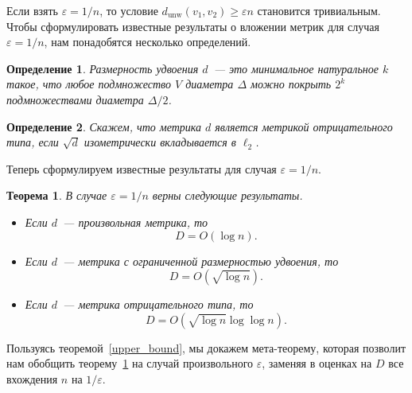 \documentclass[12pt]{article}
\newcommand{\eps}{\varepsilon}
\newcommand{\dunw}{d_{\mathrm{unw}}}
\newtheorem{definition}{Определение}
\newtheorem{theorem}{Теорема}
\begin{document}
    Если взять $\eps = 1/n$, то условие $\dunw(v_1, v_2) \geq \eps n$ становится тривиальным.
    Чтобы сформулировать известные результаты о вложении метрик для случая $\eps = 1/n$, нам понадобятся несколько
    определений.

    \begin{definition}
        \emph{Размерность удвоения} $d$~--- это минимальное натуральное $k$ такое, что любое подмножество $V$
        диаметра $\Delta$ можно покрыть $2^k$ подмножествами диаметра $\Delta / 2$.
    \end{definition}
    \begin{definition}
        Скажем, что метрика $d$ является \emph{метрикой отрицательного типа}, если $\sqrt{d}$ изометрически
        вкладывается в $\ell_2$.
    \end{definition}

    Теперь сформулируем известные результаты для случая $\eps = 1/n$.

    \begin{theorem}
        \label{embeddings}
        В случае $\eps = 1 / n$ верны следующие результаты.
        \begin{itemize}
            \item
            \cite{B85} Если $d$~--- произвольная метрика, то
            $$
                D = O(\log n).
            $$
            \item
            \cite{GKL03} Если $d$~--- метрика с ограниченной размерностью удвоения, то
            $$
                D = O\left(\sqrt{\log n}\right).
            $$
            \item
            \cite{ALN05} Если $d$~--- метрика отрицательного типа, то
            $$
                D = O\left(\sqrt{\log n} \log \log n\right).
            $$
        \end{itemize}
    \end{theorem}

    Пользуясь теоремой~\ref{upper_bound}, мы докажем мета-теорему, которая позволит нам обобщить теорему~\ref{embeddings}
    на случай произвольного $\eps$, заменяя в оценках на $D$ все вхождения $n$ на $1 / \eps$.
\end{document}
